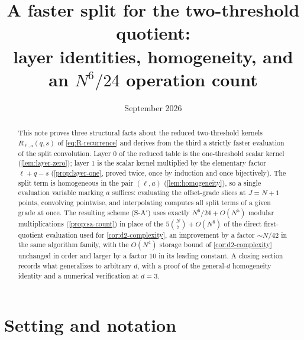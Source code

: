 \documentclass[11pt,reqno]{amsart}
\title[A faster split for the two-threshold quotient]
      {A faster split for the two-threshold quotient:\\
       layer identities, homogeneity, and an $N^6/24$ operation count}
\date{September 2026}
\theoremstyle{definition}
\theoremstyle{remark}
\begin{document}
\maketitle

\begin{abstract}
This note proves three structural facts about the reduced two-threshold
kernels $R_{\ell,a}(q,s)$ of \eqref{eq:R-recurrence} and derives from the
third a strictly faster evaluation of the split convolution.  Layer $0$ of
the reduced table is the one-threshold scalar kernel
(\cref{lem:layer-zero}); layer $1$ is the scalar kernel multiplied by the
elementary factor $\ell+q-s$ (\cref{prop:layer-one}, proved twice, once by
induction and once bijectively).  The split term is homogeneous in the pair
$(\ell,a)$ (\cref{lem:homogeneity}), so a single evaluation variable marking
$a$ suffices: evaluating the offset-grade slices at $J=N+1$ points,
convolving pointwise, and interpolating computes all split terms of a given
grade at once.  The resulting scheme (S-A$'$) uses exactly
$N^6/24+O(N^5)$ modular multiplications
(\cref{prop:sa-count}) in place of the $5\binom N7+O(N^6)$ of the direct
first-quotient evaluation used for \cref{cor:d2-complexity}, an improvement
by a factor $\sim N/42$ in the same algorithm family, with the $O(N^4)$
storage bound of \cref{cor:d2-complexity} unchanged in order and larger by a
factor $10$ in its leading constant.  A closing section records what
generalizes to arbitrary $d$, with a proof of the general-$d$ homogeneity
identity and a numerical verification at $d=3$.
\end{abstract}

\section{Setting and notation}\label{sec:setting}
\end{document}
